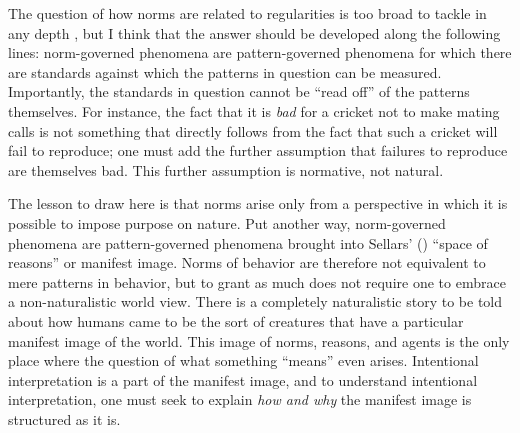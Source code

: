 The question of how norms are related to regularities is too broad to tackle in any depth \citep[see][]{Brandom:1994,Kripke:1982}, but I think that the answer should be developed along the following lines: norm-governed phenomena are pattern-governed phenomena for which there are standards against which the patterns in question can be measured. Importantly, the standards in question cannot be ``read off'' of the patterns themselves. For instance, the fact that it is \textit{bad} for a cricket not to make mating calls is not something that directly follows from the fact that such a cricket will fail to reproduce; one must add the further assumption that failures to reproduce are themselves bad. This further assumption is normative, not natural.

The lesson to draw here is that norms arise only from a perspective in which it is possible to impose purpose on nature. Put another way, norm-governed phenomena are pattern-governed phenomena brought into Sellars' (\citeyear{Sellars:1963}) ``space of reasons'' or manifest image. Norms of behavior are therefore not equivalent to mere patterns in behavior, but to grant as much does not require one to embrace a non-naturalistic world view. There is a completely naturalistic story to be told about how humans came to be the sort of creatures that have a particular manifest image of the world. This image of norms, reasons, and agents is the only place where the question of what something ``means'' even arises. Intentional interpretation is a part of the manifest image, and to understand intentional interpretation, one must seek to explain \textit{how and why} the manifest image is structured as it is.

